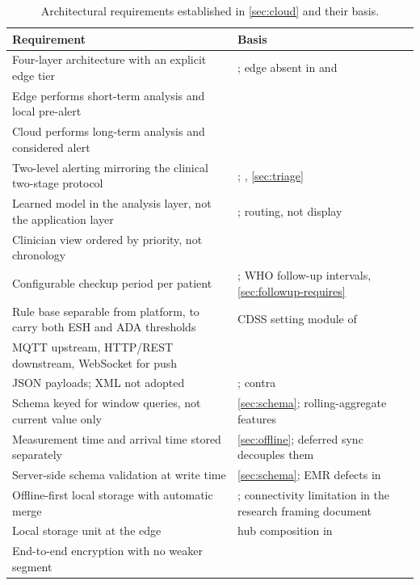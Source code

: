 \documentclass[12pt,a4paper,oneside]{report}
\begin{document}
\begin{table}[htbp]
\centering\footnotesize
\caption{Architectural requirements established in \cref{sec:cloud} and their basis.}\label{tab:spec22}
\begin{tabularx}{\textwidth}{@{}X >{\raggedright\arraybackslash}p{5.9cm}@{}}
\toprule
\textbf{Requirement} & \textbf{Basis} \\
\midrule
Four-layer architecture with an explicit edge tier & \textcite{mucchi2021}; edge absent in \textcite{efendi2025} and \textcite{yazdani2018} \\
Edge performs short-term analysis and local pre-alert & \textcite{mucchi2021} \\
Cloud performs long-term analysis and considered alert & \textcite{mucchi2021} \\
Two-level alerting mirroring the clinical two-stage protocol & \textcite{mucchi2021}; \textcite{mihevc2025}, \cref{sec:triage} \\
Learned model in the analysis layer, not the application layer & \textcite{liu2025review}; routing, not display \\
Clinician view ordered by priority, not chronology & \textcite{yazdani2018} \\
Configurable checkup period per patient & \textcite{yazdani2018}; WHO follow-up intervals, \cref{sec:followup-requires} \\
Rule base separable from platform, to carry both ESH and ADA thresholds & CDSS setting module of \textcite{yazdani2018} \\
MQTT upstream, HTTP/REST downstream, WebSocket for push & \textcite{efendi2025} \\
JSON payloads; XML not adopted & \textcite{efendi2025}; contra \textcite{yazdani2018} \\
Schema keyed for window queries, not current value only & \cref{sec:schema}; rolling-aggregate features \\
Measurement time and arrival time stored separately & \cref{sec:offline}; deferred sync decouples them \\
Server-side schema validation at write time & \cref{sec:schema}; EMR defects in \textcite{liu2025review} \\
Offline-first local storage with automatic merge & \textcite{efendi2025}; connectivity limitation in the research framing document \\
Local storage unit at the edge & hub composition in \textcite{mucchi2021} \\
End-to-end encryption with no weaker segment & \textcite{mucchi2021} \\

\end{tabularx}
\end{table}
\end{document}
